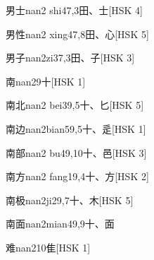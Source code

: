 \begin{entry}{男士}{nan2 shi4}{7,3}{⽥、⼠}[HSK 4]
\end{entry}

\begin{entry}{男性}{nan2 xing4}{7,8}{⽥、⼼}[HSK 5]
\end{entry}

\begin{entry}{男子}{nan2zi3}{7,3}{⽥、⼦}[HSK 3]
\end{entry}

\begin{entry}{南}{nan2}{9}{⼗}[HSK 1]
\end{entry}

\begin{entry}{南北}{nan2 bei3}{9,5}{⼗、⼔}[HSK 5]
\end{entry}

\begin{entry}{南边}{nan2bian5}{9,5}{⼗、⾡}[HSK 1]
\end{entry}

\begin{entry}{南部}{nan2 bu4}{9,10}{⼗、⾢}[HSK 3]
\end{entry}

\begin{entry}{南方}{nan2 fang1}{9,4}{⼗、⽅}[HSK 2]
\end{entry}

\begin{entry}{南极}{nan2ji2}{9,7}{⼗、⽊}[HSK 5]
\end{entry}

\begin{entry}{南面}{nan2mian4}{9,9}{⼗、⾯}
\end{entry}

\begin{entry}{难}{nan2}{10}{⾫}[HSK 1]
\end{entry}

